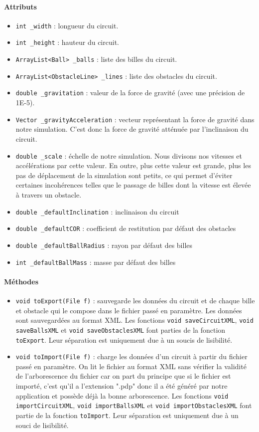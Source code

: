 \documentclass{report}
\begin{document}
\paragraph*{Attributs}
\begin{itemize}
\item \texttt{int \_width} : longueur du circuit.
\item \texttt{int \_height} : hauteur du circuit.
\item \texttt{ArrayList<Ball> \_balls} : liste des billes du circuit.
\item \texttt{ArrayList<ObstacleLine> \_lines} : liste des obstacles du circuit.
\item \texttt{double \_gravitation} : valeur de la force de gravité (avec une précision de 1E-5).
\item \texttt{Vector \_gravityAcceleration} : vecteur représentant la force de gravité dans notre simulation. C'est donc la force de gravité atténuée par l'inclinaison du circuit.
\item \texttt{double \_scale} : échelle de notre simulation. Nous divisons nos vitesses et accélérations par cette valeur. En outre, plus cette valeur est grande, plus les pas de déplacement de la simulation sont petits, ce qui permet d'éviter certaines incohérences telles que le passage de billes dont la vitesse est élevée à travers un obstacle.
\item \texttt{double \_defaultInclination} : inclinaison du circuit
\item \texttt{double \_defaultCOR} : coefficient de restitution par défaut des obstacles
\item \texttt{double \_defaultBallRadius} : rayon par défaut des billes
\item \texttt{int \_defaultBallMass} : masse par défaut des billes
\end{itemize}

\paragraph*{Méthodes}
\begin{itemize}
\item \texttt{void toExport(File f)} : sauvegarde les données du circuit et de chaque bille et obstacle qui le compose dans le fichier passé en paramètre. Les données sont sauvegardées au format XML. Les fonctions \texttt{void saveCircuitXML}, \texttt{void saveBallsXML} et \texttt{void saveObstaclesXML} font parties de la fonction \texttt{toExport}. Leur séparation est uniquement due à un soucis de lisibilité.
\item \texttt{void toImport(File f)} : charge les données d'un circuit à partir du fichier passé en paramètre. On lit le fichier au format XML sans vérifier la validité de l'arborescence du fichier car on part du principe que si le fichier est importé, c'est qu'il a l'extension ".pdp" donc il a été généré par notre application et possède déjà la bonne arborescence. Les fonctions \texttt{void importCircuitXML}, \texttt{void importBallsXML} et \texttt{void importObstaclesXML} font partie de la fonction \texttt{toImport}. Leur séparation est uniquement due à un souci de lisibilité.
\end{itemize}
\end{document}
